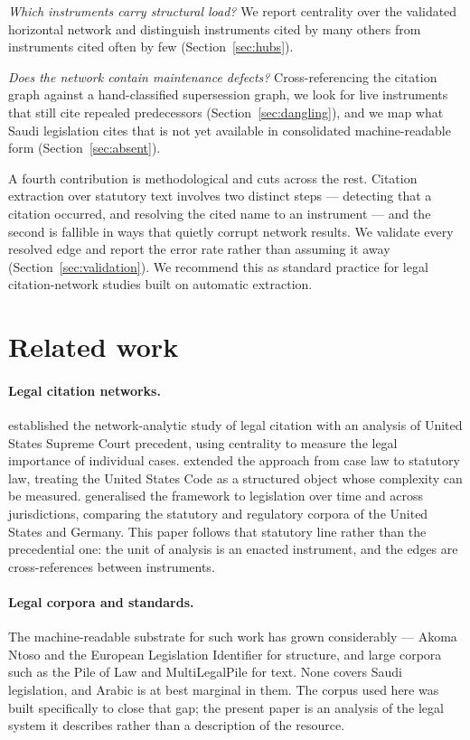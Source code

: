 \documentclass[sn-basic]{sn-jnl}%
\begin{document}
\emph{Which instruments carry structural load?} We report centrality over
the validated horizontal network and distinguish instruments cited by many
others from instruments cited often by few (Section~\ref{sec:hubs}).

\emph{Does the network contain maintenance defects?} Cross-referencing the
citation graph against a hand-classified supersession graph, we look for
live instruments that still cite repealed predecessors
(Section~\ref{sec:dangling}), and we map what Saudi legislation cites that
is not yet available in consolidated machine-readable form
(Section~\ref{sec:absent}).

A fourth contribution is methodological and cuts across the rest. Citation
extraction over statutory text involves two distinct steps --- detecting
that a citation occurred, and resolving the cited name to an instrument ---
and the second is fallible in ways that quietly corrupt network results. We
validate every resolved edge and report the error rate rather than assuming
it away (Section~\ref{sec:validation}). We recommend this as standard
practice for legal citation-network studies built on automatic extraction.

\section{Related work}
\label{sec:related}

\paragraph{Legal citation networks.}
\citet{fowler2007network} established the network-analytic study of legal
citation with an analysis of United States Supreme Court precedent, using
centrality to measure the legal importance of individual cases.
\citet{katz2014complexity} extended the approach from case law to statutory
law, treating the United States Code as a structured object whose complexity
can be measured. \citet{coupette2021measuring} generalised the framework to
legislation over time and across jurisdictions, comparing the statutory and
regulatory corpora of the United States and Germany. This paper follows that
statutory line rather than the precedential one: the unit of analysis is an
enacted instrument, and the edges are cross-references between instruments.

\paragraph{Legal corpora and standards.}
The machine-readable substrate for such work has grown considerably ---
Akoma Ntoso \citep{palmirani2011akoma} and the European Legislation
Identifier for structure, and large corpora such as the Pile of Law
\citep{henderson2022pileoflaw} and MultiLegalPile
\citep{niklaus2024multilegalpile} for text. None covers Saudi legislation,
and Arabic is at best marginal in them. The corpus used here
\citep{almohammedi2026corpus} was built specifically to close that gap; the
present paper is an analysis of the legal system it describes rather than a
description of the resource.
\end{document}
